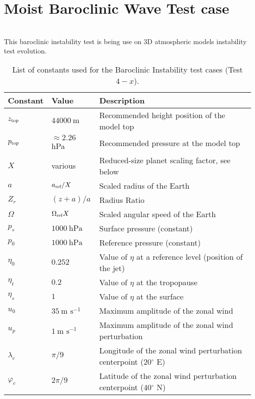 \documentclass[times,doublespace]{fldauth}
\begin{document}

\clearpage
\section{Moist Baroclinic Wave Test case}   
 
~\\ This baroclinic instability test is being use on 3D atmospheric models instability test evolution.

 
\begin{table}[h]

\caption{List of constants used for the Baroclinic Instability test cases (Test $4-x$).}
\label{test4:tab}
\begin{tabular*}{\textwidth}{@{\extracolsep{\fill}}lll}
\hline Constant & Value & Description \\
\hline 
$z_{\tiny \mbox{top}}$ & $44000\ \mbox{m}$ & Recommended height position of the model top \\
$p_{\tiny \mbox{top}}$ & $\approx 2.26$ hPa & Recommended pressure at the model top\\
$X$ & various & Reduced-size planet scaling factor, see below\\
$a$ & $a_{\tiny \mbox{ref}}/X$ & Scaled radius of the Earth \\
$Z_r$ & $(z+a)/a$ & Radius Ratio\\
$\Omega$ & $\Omega_{\tiny \mbox{ref}}X$ & Scaled angular speed of the Earth \\
$p_s$ & $1000\ \mbox{hPa}$ & Surface pressure (constant) \\
$p_0$ & $1000\ \mbox{hPa}$ & Reference pressure (constant) \\
$\eta_0$ & $0.252$ & Value of $\eta$ at a reference level (position of the jet)\\
$\eta_t$ & $0.2$ & Value of $\eta$ at the tropopause \\
$\eta_s$ & $1$ & Value of $\eta$ at the surface \\
$u_0$ & $35\ \mbox{m\ s}^{-1}$ & Maximum amplitude of the zonal wind \\
$u_p$ & $1\ \mbox{m\ s}^{-1}$ & Maximum amplitude of the zonal wind perturbation \\
$\lambda_c$ & $\pi / 9$ & Longitude of the zonal wind perturbation centerpoint (20$^\circ$ E)\\
$\varphi_c$ & $2 \pi / 9$ & Latitude of the zonal wind perturbation centerpoint (40$^\circ$ N)\\

\end{tabular*}
\end{table}
\end{document}
